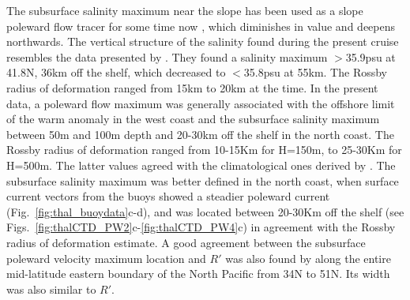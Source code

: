 The subsurface salinity maximum near the slope has been used as a
slope poleward flow tracer for some time now
\citep[e.g.][]{Frouin90,Hill93,Souza01}, which diminishes in value
and deepens northwards. The vertical structure of the salinity
found during the present cruise resembles the data presented by
\citet{Frouin90}. They found a salinity maximum $>$35.9psu at
41.8\deg N, 36km off the shelf, which decreased to $<$35.8psu at
55km. The Rossby radius of deformation ranged from 15km to 20km at
the time. In the present data, a poleward flow maximum was
generally associated with the offshore limit of the warm anomaly
in the west coast and the subsurface salinity maximum between 50m
and 100m depth and 20-30km off the shelf in the north coast. The
Rossby radius of deformation ranged from 10-15Km for H=150m, to
25-30Km for H=500m. The latter values agreed with the
climatological ones derived by \citet{Chelton98}. The subsurface
salinity maximum was better defined in the north coast, when
surface current vectors from the buoys showed a steadier poleward
current (Fig.~\ref{fig:thal_buoydata}c-d), and was located between
20-30Km off the shelf (see
Figs.~\ref{fig:thalCTD_PW2}c-\ref{fig:thalCTD_PW4}c) in agreement
with the Rossby radius of deformation estimate. A good agreement
between the subsurface poleward velocity maximum location and $R'$
was also found by \citet{Pierce00} along the entire mid-latitude
eastern boundary of the North Pacific from 34\deg N to 51\deg N.
Its width was also similar to $R'$.


